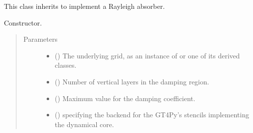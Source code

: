 \documentclass[letterpaper,10pt,english]{sphinxmanual}
\begin{document}

\begin{fulllineitems}
\label{\detokenize{api:dycore.vertical_damping.VerticalDampingRayleigh}}
This class inherits {\hyperref[\detokenize{api:dycore.vertical_damping.VerticalDamping}]{}} to implement a Rayleigh absorber.

\begin{fulllineitems}
\label{\detokenize{api:dycore.vertical_damping.VerticalDampingRayleigh.__init__}}
Constructor.
\begin{quote}\begin{description}
\item[{Parameters}] \leavevmode\begin{itemize}
\item {} 
 () \textendash{} The underlying grid, as an instance of {\hyperref[\detokenize{api:grids.grid_xyz.GridXYZ}]{}} or one of its derived classes.

\item {} 
 () \textendash{} Number of vertical layers in the damping region.

\item {} 
 () \textendash{} Maximum value for the damping coefficient.

\item {} 
 () \textendash{}  specifying the backend for the GT4Py’s stencils implementing the dynamical core.

\end{itemize}

\end{description}\end{quote}

\end{fulllineitems}


\end{fulllineitems}
\end{document}
